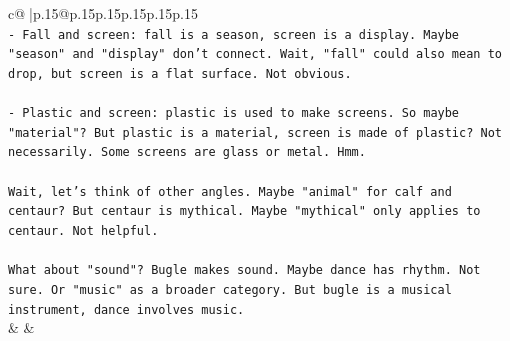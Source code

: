 \documentclass{article}
\begin{document}
{\begin{supertabular}{c@{$\;$}|p{.15\linewidth}@{}p{.15\linewidth}p{.15\linewidth}p{.15\linewidth}p{.15\linewidth}p{.15\linewidth}}
{{{\\ 
\texttt{{-} Fall and screen: fall is a season, screen is a display. Maybe "season" and "display" don't connect. Wait, "fall" could also mean to drop, but screen is a flat surface. Not obvious.} \\
\\ 
\texttt{{-} Plastic and screen: plastic is used to make screens. So maybe "material"? But plastic is a material, screen is made of plastic? Not necessarily. Some screens are glass or metal. Hmm.} \\
\\ 
\texttt{Wait, let's think of other angles. Maybe "animal" for calf and centaur? But centaur is mythical. Maybe "mythical" only applies to centaur. Not helpful.} \\
\\ 
\texttt{What about "sound"? Bugle makes sound. Maybe dance has rhythm. Not sure. Or "music" as a broader category. But bugle is a musical instrument, dance involves music.} \\
            }
        }
    }
    & & \\ \\


\end{supertabular}}
\end{document}
